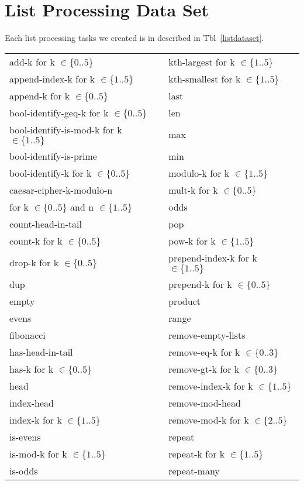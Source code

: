 \documentclass{article}
\begin{document}
\section{List Processing Data Set}
Each list processing tasks we created is in described in
Tbl~\ref{listdataset}.

\begin{table}[h]
  \centering\footnotesize
  \begin{tabular}{|l|l|}\hline
    add-k for k $\in\{0..5\}$&
kth-largest for k $\in\{1..5\}$\\
    append-index-k for k $\in\{1..5\}$&
kth-smallest for k $\in\{1..5\}$\\
    append-k for k $\in\{0..5\}$&
last\\
    bool-identify-geq-k for k $\in\{0..5\}$&
len\\
    bool-identify-is-mod-k for k $\in\{1..5\}$&
max\\
    bool-identify-is-prime&
min\\
    bool-identify-k for k $\in\{0..5\}$&
modulo-k for k $\in\{1..5\}$\\
    caesar-cipher-k-modulo-n&
mult-k for k $\in\{0..5\}$\\
    \qquad for k $\in\{0..5\}$ and n $\in\{1..5\}$&
odds\\
    count-head-in-tail&
pop\\
    count-k for k $\in\{0..5\}$&
pow-k for k $\in\{1..5\}$\\
    drop-k for k $\in\{0..5\}$&
prepend-index-k for k $\in\{1..5\}$\\
    dup&
prepend-k for k $\in\{0..5\}$\\
    empty&
product\\
    evens&
range\\
    fibonacci&
remove-empty-lists\\
    has-head-in-tail&
remove-eq-k for k $\in\{0..3\}$\\
    has-k for k $\in\{0..5\}$&
remove-gt-k for k $\in\{0..3\}$\\
    head&
remove-index-k for k $\in\{1..5\}$\\
    index-head&
remove-mod-head\\
    index-k for k $\in\{1..5\}$&
remove-mod-k for k $\in\{2..5\}$\\
    is-evens&
repeat\\
    is-mod-k for k $\in\{1..5\}$&
repeat-k for k $\in\{1..5\}$\\
    is-odds&
repeat-many\\

\end{tabular}
\end{table}
\end{document}
